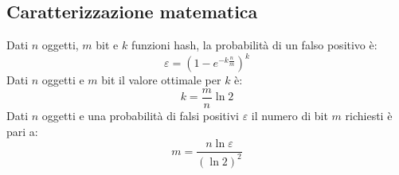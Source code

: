 \subsection{Caratterizzazione matematica}
Dati $n$ oggetti, $m$ bit e $k$ funzioni hash, la probabilit\`a di un falso positivo \`e:
\begin{equation*}
    \varepsilon=(1-e^{-k\frac{n}{m}})^k
\end{equation*}
Dati $n$ oggetti e $m$ bit il valore ottimale per $k$ \`e:
\begin{equation*}
    k=\dfrac{m}{n}\ln 2
\end{equation*}
Dati $n$ oggetti e una probabilit\`a di falsi positivi $\varepsilon$ il numero di bit $m$ richiesti \`e pari a:
\begin{equation*}
    m=\dfrac{n\ln\varepsilon}{(\ln 2)^2}
\end{equation*}